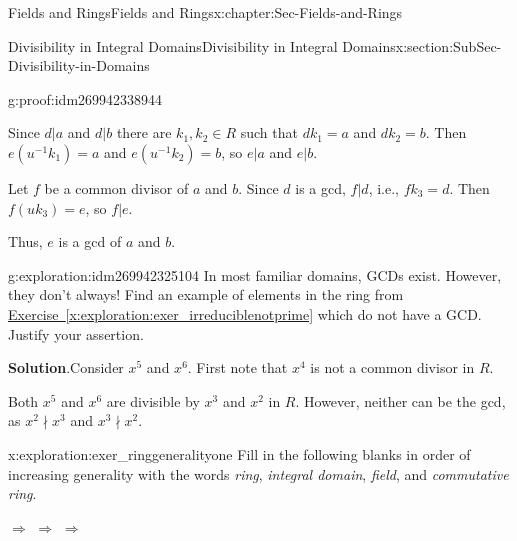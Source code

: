 \documentclass[oneside,10pt,]{book}
\numberwithin{equation}{section}
\begin{document}
\begin{chapterptx}{Fields and Rings}{}{Fields and Rings}{}{}{x:chapter:Sec-Fields-and-Rings}
\begin{sectionptx}{Divisibility in Integral Domains}{}{Divisibility in Integral Domains}{}{}{x:section:SubSec-Divisibility-in-Domains}
\begin{proofptx}{}{g:proof:idm269942338944}
\par
Since \(d|a\) and \(d|b\) there are \(k_1,k_2\in R\) such that \(d k_1 = a\) and \(d k_2 = b\). Then \(e (u^{-1} k_1) = a\) and \(e (u^{-1} k_2) = b\), so \(e|a\) and \(e|b\).%
\par
Let \(f\) be a common divisor of \(a\) and \(b\). Since \(d\) is a gcd, \(f|d\), i.e., \(f k_3 = d\). Then \(f (uk_3) = e\), so \(f|e\).%
\par
Thus, \(e\) is a gcd of \(a\) and \(b\).%
\end{proofptx}
\begin{exploration}{}{g:exploration:idm269942325104}%
In most familiar domains, GCDs exist. However, they don't always! Find an example of elements in the ring from \hyperref[x:exploration:exer_irreduciblenotprime]{Exercise~\ref{x:exploration:exer_irreduciblenotprime}} which do not have a GCD. Justify your assertion.%
\par\smallskip%
\noindent\textbf{Solution}.\hypertarget{g:solution:idm269942323136}{}\quad{}Consider \(x^5\) and \(x^6\). First note that \(x^4\) is not a common divisor in \(R\).%
\par
Both \(x^5\) and \(x^6\) are divisible by \(x^3\) and \(x^2\) in \(R\). However, neither can be the gcd, as \(x^2\nmid x^3\) and \(x^3\nmid x^2\).%
\end{exploration}
\begin{exploration}{}{x:exploration:exer_ringgeneralityone}%
Fill in the following blanks in order of increasing generality with the words \emph{ring}, \emph{integral domain}, \emph{field}, and \emph{commutative ring}.%
\par
\textunderscore{}\textunderscore{}\textunderscore{}\textunderscore{}\textunderscore{}\textunderscore{}\textunderscore{}\textunderscore{}\textunderscore{}\textunderscore{} \(\Rightarrow\) \textunderscore{}\textunderscore{}\textunderscore{}\textunderscore{}\textunderscore{}\textunderscore{}\textunderscore{}\textunderscore{}\textunderscore{}\textunderscore{} \(\Rightarrow\) \textunderscore{}\textunderscore{}\textunderscore{}\textunderscore{}\textunderscore{}\textunderscore{}\textunderscore{}\textunderscore{}\textunderscore{}\textunderscore{} \(\Rightarrow\) \textunderscore{}\textunderscore{}\textunderscore{}\textunderscore{}\textunderscore{}\textunderscore{}\textunderscore{}\textunderscore{}\textunderscore{}\textunderscore{}%
\end{exploration}
\end{sectionptx}
%
%
\typeout{************************************************}

\end{chapterptx}
\end{document}
